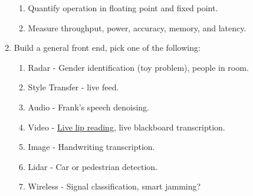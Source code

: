 \documentclass[12pt]{article}
\begin{document}
\begin{enumerate}
\begin{enumerate}
    \item Quantify operation in floating point and fixed point.
    \item Measure throughput, power, accuracy, memory, and latency.
  \end{enumerate}
\item Build a general front end, pick one of the following:
  \begin{enumerate}
    \item Radar - Gender identification (toy problem), people in room.
    \item Style Transfer - live feed.
    \item Audio - Frank's speech denoising.
    \item Video - \href{https://arxiv.org/pdf/1611.01599.pdf}{Live lip reading}, live 
      blackboard transcription.
    \item Image - Handwriting transcription.
    \item Lidar - Car or pedestrian detection.
    \item Wireless - Signal classification, smart jamming?
  \end{enumerate}
\end{enumerate}
\end{document}
